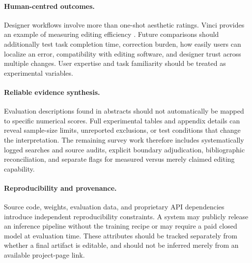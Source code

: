 \paragraph{Human-centred outcomes.}
Designer workflows involve more than one-shot aesthetic ratings. Vinci provides an example of measuring editing efficiency \citep{vinci2021}. Future comparisons should additionally test task completion time, correction burden, how easily users can localize an error, compatibility with editing software, and designer trust across multiple changes. User expertise and task familiarity should be treated as experimental variables.

\paragraph{Reliable evidence synthesis.}
Evaluation descriptions found in abstracts should not automatically be mapped to specific numerical scores. Full experimental tables and appendix details can reveal sample-size limits, unreported exclusions, or test conditions that change the interpretation. The remaining survey work therefore includes systematically logged searches and source audits, explicit boundary adjudication, bibliographic reconciliation, and separate flags for measured versus merely claimed editing capability.

\paragraph{Reproducibility and provenance.}
Source code, weights, evaluation data, and proprietary API dependencies introduce independent reproducibility constraints. A system may publicly release an inference pipeline without the training recipe or may require a paid closed model at evaluation time. These attributes should be tracked separately from whether a final artifact is editable, and should not be inferred merely from an available project-page link.
